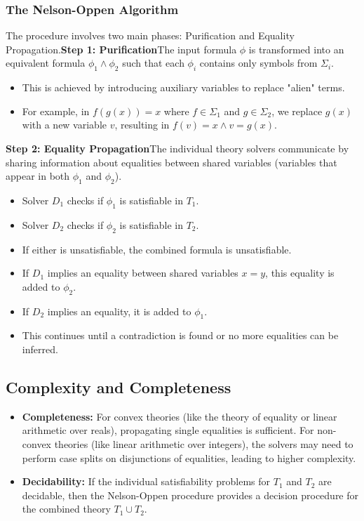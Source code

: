 \documentclass{article}
\begin{document}
\subsubsection{The Nelson-Oppen Algorithm}The procedure involves two main phases: Purification and Equality Propagation.\textbf{Step 1: Purification}The input formula $\phi$ is transformed into an equivalent formula $\phi_1 \land \phi_2$ such that each $\phi_i$ contains only symbols from $\Sigma_i$.\begin{itemize}\item This is achieved by introducing auxiliary variables to replace "alien" terms.\item For example, in $f(g(x)) = x$ where $f \in \Sigma_1$ and $g \in \Sigma_2$, we replace $g(x)$ with a new variable $v$, resulting in $f(v) = x \land v = g(x)$.\end{itemize}\textbf{Step 2: Equality Propagation}The individual theory solvers communicate by sharing information about equalities between shared variables (variables that appear in both $\phi_1$ and $\phi_2$).\begin{itemize}\item Solver $D_1$ checks if $\phi_1$ is satisfiable in $T_1$.\item Solver $D_2$ checks if $\phi_2$ is satisfiable in $T_2$.\item If either is unsatisfiable, the combined formula is unsatisfiable.\item If $D_1$ implies an equality between shared variables $x = y$, this equality is added to $\phi_2$.\item If $D_2$ implies an equality, it is added to $\phi_1$.\item This continues until a contradiction is found or no more equalities can be inferred.\end{itemize}\subsection{Complexity and Completeness}\begin{itemize}\item \textbf{Completeness:} For convex theories (like the theory of equality or linear arithmetic over reals), propagating single equalities is sufficient. For non-convex theories (like linear arithmetic over integers), the solvers may need to perform case splits on disjunctions of equalities, leading to higher complexity.\item \textbf{Decidability:} If the individual satisfiability problems for $T_1$ and $T_2$ are decidable, then the Nelson-Oppen procedure provides a decision procedure for the combined theory $T_1 \cup T_2$.\end{itemize}
\end{document}
